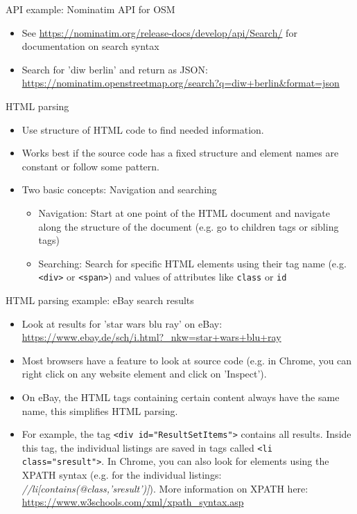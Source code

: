 \begin{frame}{API example: Nominatim API for OSM}
\begin{itemize}
	\item See \url{https://nominatim.org/release-docs/develop/api/Search/} for documentation on search syntax
	\item Search for 'diw berlin' and return as JSON: \url{https://nominatim.openstreetmap.org/search?q=diw+berlin&format=json}
\end{itemize}

\end{frame}

\begin{frame}{HTML parsing}
\begin{itemize}
	\item Use structure of HTML code to find needed information.
	\item Works best if the source code has a fixed structure and element names are constant or follow some pattern.
	\item Two basic concepts: Navigation and searching
	\begin{itemize}
		\item Navigation: Start at one point of the HTML document and navigate along the structure of the document (e.g. go to children tags or sibling tags)
		\item Searching: Search for specific HTML elements using their tag name (e.g. \texttt{<div>} or \texttt{<span>}) and values of attributes like \texttt{class} or \texttt{id}
	\end{itemize}
\end{itemize}
\end{frame}

\begin{frame}{HTML parsing example: eBay search results}
\begin{itemize}
	\item Look at results for 'star wars blu ray' on eBay: \url{https://www.ebay.de/sch/i.html?_nkw=star+wars+blu+ray}
	\item Most browsers have a feature to look at source code (e.g. in Chrome, you can right click on any website element and click on 'Inspect').
	\item On eBay, the HTML tags containing certain content always have the same name, this simplifies HTML parsing.
	\item For example, the tag \texttt{<div id="ResultSetItems">} contains all results. Inside this tag, the individual listings are saved in tags called \texttt{<li class="sresult">}. In Chrome, you can also look for elements using the XPATH syntax (e.g. for the individual listings: \textit{//li[contains(@class,'sresult')]}). More information on XPATH here: \url{https://www.w3schools.com/xml/xpath_syntax.asp}
\end{itemize}
\end{frame}

